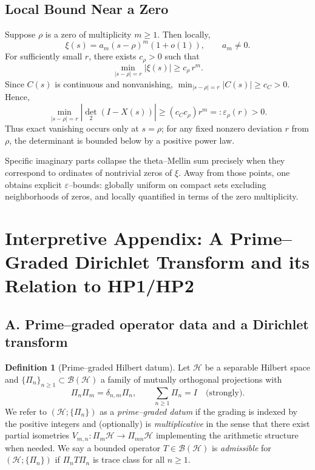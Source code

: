\documentclass[11pt]{article}
\numberwithin{equation}{section}
\theoremstyle{definition}
\newtheorem{definition}[theorem]{Definition}
\theoremstyle{remark}
\newcommand{\1}{\mathbbm{1}}
\begin{document}
\subsection{Local Bound Near a Zero}
Suppose $\rho$ is a zero of multiplicity $m\geq 1$. Then locally,
\begin{equation}
\xi(s) = a_m (s-\rho)^m (1+o(1)), \qquad a_m\neq 0.
\end{equation}
For sufficiently small $r$, there exists $c_\rho>0$ such that
\begin{equation}
\min_{|s-\rho|=r} |\xi(s)| \geq c_\rho \, r^m.
\end{equation}
Since $C(s)$ is continuous and nonvanishing, $\min_{|s-\rho|=r}|C(s)|\geq c_C>0$. Hence,
\begin{equation}
\min_{|s-\rho|=r} |\det_{2}(I - X(s))| \geq (c_C c_\rho) r^m =: \varepsilon_\rho(r) > 0.
\end{equation}
Thus exact vanishing occurs only at $s=\rho$; for any fixed nonzero deviation $r$ from $\rho$, the determinant is bounded below by a positive power law.

Specific imaginary parts collapse the theta--Mellin sum precisely when they correspond to ordinates of nontrivial zeros of $\xi$. Away from those points, one obtains explicit $\varepsilon$--bounds: globally uniform on compact sets excluding neighborhoods of zeros, and locally quantified in terms of the zero multiplicity.
\appendix
\section*{Interpretive Appendix: A Prime–Graded Dirichlet Transform and its Relation to HP1/HP2}

\subsection*{A. Prime–graded operator data and a Dirichlet transform}

\begin{definition}[Prime–graded Hilbert datum]
Let $\mathcal H$ be a separable Hilbert space and $\{\Pi_n\}_{n\ge1}\subset\mathcal B(\mathcal H)$ a family of mutually orthogonal projections with
\[
\Pi_n\Pi_m=\delta_{n,m}\Pi_n,\qquad \sum_{n\ge1}\Pi_n=I\quad\text{(strongly)}.
\]
We refer to $(\mathcal H;\{\Pi_n\})$ as a \emph{prime–graded datum} if the grading is indexed by the positive integers and (optionally) is \emph{multiplicative} in the sense that there exist partial isometries $V_{m,n}:\Pi_m\mathcal H\to \Pi_{mn}\mathcal H$ implementing the arithmetic structure when needed. We say a bounded operator $T\in\mathcal B(\mathcal H)$ is \emph{admissible} for $(\mathcal H;\{\Pi_n\})$ if $\Pi_nT\Pi_n$ is trace class for all $n\ge1$.
\end{definition}
\end{document}
